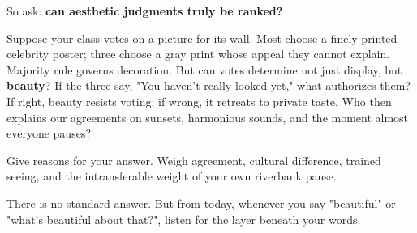 So ask: \textbf{can aesthetic judgments truly be ranked?}

Suppose your class votes on a picture for its wall. Most choose a finely printed celebrity poster; three choose a gray print whose appeal they cannot explain. Majority rule governs decoration. But can votes determine not just display, but \textbf{beauty}? If the three say, "You haven't really looked yet," what authorizes them? If right, beauty resists voting; if wrong, it retreats to private taste. Who then explains our agreements on sunsets, harmonious sounds, and the moment almost everyone pauses?

Give reasons for your answer. Weigh agreement, cultural difference, trained seeing, and the intransferable weight of your own riverbank pause.

There is no standard answer. But from today, whenever you say "beautiful" or "what's beautiful about that?", listen for the layer beneath your words.
